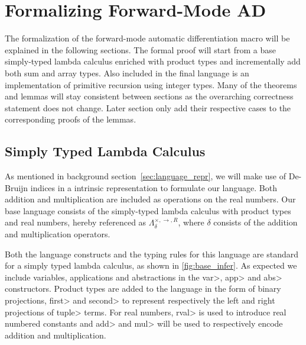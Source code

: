 \documentclass[11pt, final]{article}
\begin{document}

\newpage


\newpage

\setcounter{page}{3}
\tableofcontents
\newpage

% 


% 
% 
% 
% 

\section{Formalizing Forward-Mode AD}
  The formalization of the forward-mode automatic differentiation macro will be explained in the following sections.
  The formal proof will start from a base simply-typed lambda calculus enriched with product types and incrementally add both sum and array types.
  Also included in the final language is an implementation of primitive recursion using integer types.
  Many of the theorems and lemmas will stay consistent between sections as the overarching correctness statement does not change.
  Later section only add their respective cases to the corresponding proofs of the lemmas.

  \subsection{Simply Typed Lambda Calculus}\label{sec:formal_stlc}
  As mentioned in background section~\ref{sec:language_repr}, we will make use of De-Bruijn indices in a intrinsic representation to formulate our language.
  Both addition and multiplication are included as operations on the real numbers.
  Our base language consists of the simply-typed lambda calculus with product types and real numbers, hereby referenced as $\Lambda_{\delta}^{\times, \rightarrow, R}$, where $\delta$ consists of the addition and multiplication operators.

  Both the language constructs and the typing rules for this language are standard for a simply typed lambda calculus, as shown in \ref{fig:base_infer}.
  As expected we include variables, applications and abstractions in the \<var>, \<app> and \<abs> constructors.
  Product types are added to the language in the form of binary projections, \<first> and \<second> to represent respectively the left and right projections of \<tuple> terms.
  For real numbers, \<rval> is used to introduce real numbered constants and \<add> and \<mul> will be used to respectively encode addition and multiplication.
\end{document}
